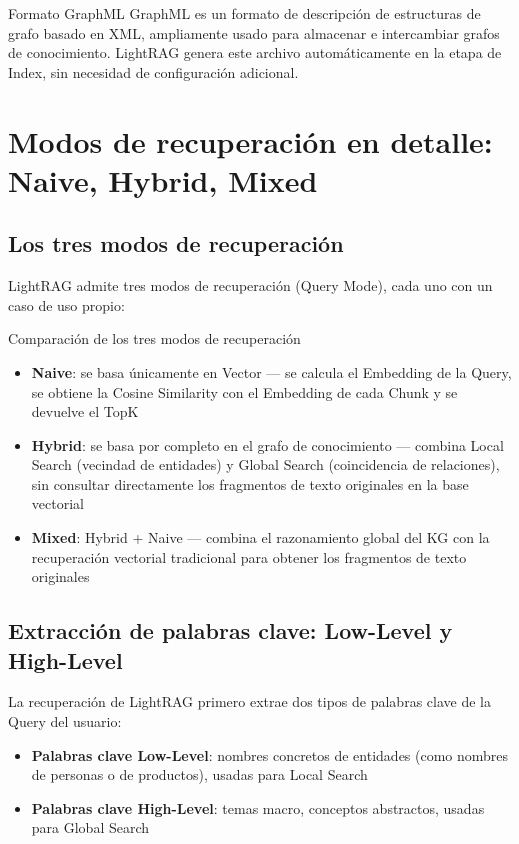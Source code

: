 \documentclass[a4paper]{article}
\begin{document}
\begin{knowledgebox}{Formato GraphML}
GraphML es un formato de descripción de estructuras de grafo basado en XML, ampliamente usado para almacenar e intercambiar grafos de conocimiento. LightRAG genera este archivo automáticamente en la etapa de Index, sin necesidad de configuración adicional.
\end{knowledgebox}

\section{Modos de recuperación en detalle: Naive, Hybrid, Mixed}

\subsection{Los tres modos de recuperación}

LightRAG admite tres modos de recuperación (Query Mode), cada uno con un caso de uso propio:

\begin{importantbox}{Comparación de los tres modos de recuperación}
\begin{itemize}
    \item \textbf{Naive}: se basa únicamente en Vector — se calcula el Embedding de la Query, se obtiene la Cosine Similarity con el Embedding de cada Chunk y se devuelve el TopK
    \item \textbf{Hybrid}: se basa por completo en el grafo de conocimiento — combina Local Search (vecindad de entidades) y Global Search (coincidencia de relaciones), sin consultar directamente los fragmentos de texto originales en la base vectorial
    \item \textbf{Mixed}: Hybrid + Naive — combina el razonamiento global del KG con la recuperación vectorial tradicional para obtener los fragmentos de texto originales
\end{itemize}
\end{importantbox}

\subsection{Extracción de palabras clave: Low-Level y High-Level}

La recuperación de LightRAG primero extrae dos tipos de palabras clave de la Query del usuario:

\begin{itemize}
    \item \textbf{Palabras clave Low-Level}: nombres concretos de entidades (como nombres de personas o de productos), usadas para Local Search
    \item \textbf{Palabras clave High-Level}: temas macro, conceptos abstractos, usadas para Global Search
\end{itemize}
\end{document}
